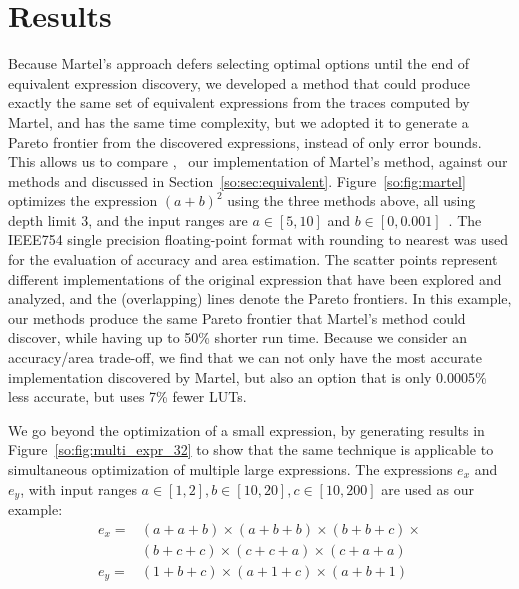\section{Results}
\label{so:sec:results}

Because Martel's approach defers selecting optimal options until the end of
equivalent expression discovery, we developed a method that could produce
exactly the same set of equivalent expressions from the traces computed by
Martel, and has the same time complexity, but we adopted it to generate
a Pareto frontier from the discovered expressions, instead of only error
bounds.  This allows us to compare \marteltrace{}, \ie~our implementation
of Martel's method, against our methods \frontiertrace{} and \greedytrace{}
discussed in Section~\ref{so:sec:equivalent}.  Figure~\ref{so:fig:martel}
optimizes the expression ${(a + b)}^2$ using the three methods above, all
using depth limit $3$, and the input ranges are $a \in [5, 10]$ and $b \in [0,
0.001]$~\cite{martel07}. The IEEE754 single precision floating-point format
with rounding to nearest was used for the evaluation of accuracy and area
estimation. The scatter points represent different implementations of the
original expression that have been explored and analyzed, and the (overlapping)
lines denote the Pareto frontiers. In this example, our methods produce the
same Pareto frontier that Martel's method could discover, while having up to
50\% shorter run time. Because we consider an accuracy/area trade-off, we
find that we can not only have the most accurate implementation discovered by
Martel, but also an option that is only 0.0005\% less accurate, but uses 7\%
fewer LUTs.

We go beyond the optimization of a small expression, by generating results in
Figure~\ref{so:fig:multi_expr_32} to show that the same technique is applicable
to simultaneous optimization of multiple large expressions. The expressions
$e_x$ and $e_y$, with input ranges $a \in [1, 2], b \in [10, 20], c \in [10,
200]$ are used as our example:
\begin{equation}
    \begin{aligned}
    e_x =& (a + a + b) \times (a + b + b) \times (b + b + c) \times {} \\
         & (b + c + c) \times (c + c + a) \times (c + a + a) \\
    e_y =& (1 + b + c) \times (a + 1 + c) \times (a + b + 1)
    \end{aligned}
\end{equation}

